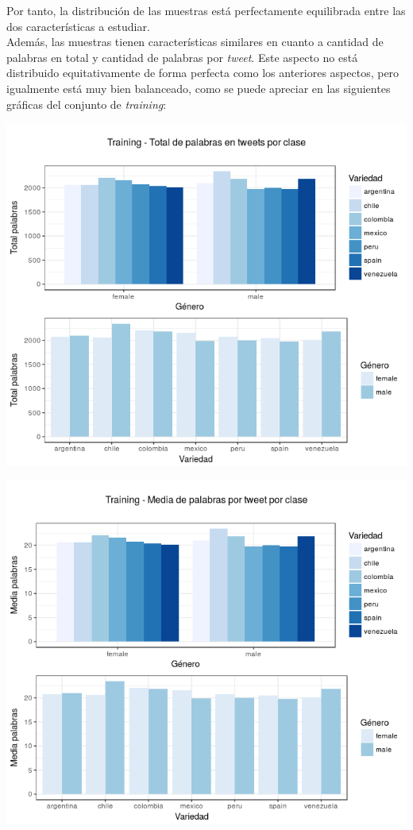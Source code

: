 \documentclass[11pt,a4paper]{article}
\begin{document}
Por tanto, la distribuci\'on de las muestras est\'a perfectamente equilibrada entre las dos caracter\'isticas a estudiar.\\
Adem\'as, las muestras tienen caracter\'isticas similares en cuanto a cantidad de palabras en total y cantidad de palabras por \textit{tweet}. Este aspecto no est\'a distribuido equitativamente de forma perfecta como los anteriores aspectos, pero igualmente est\'a muy bien balanceado, como se puede apreciar en las siguientes gr\'aficas del conjunto de \textit{training}:

\begin{center}
\includegraphics[width=\linewidth]{total_words_training.png}
\end{center}

\begin{center}
\includegraphics[width=\linewidth]{mean_words_training.png}
\end{center}
\end{document}
